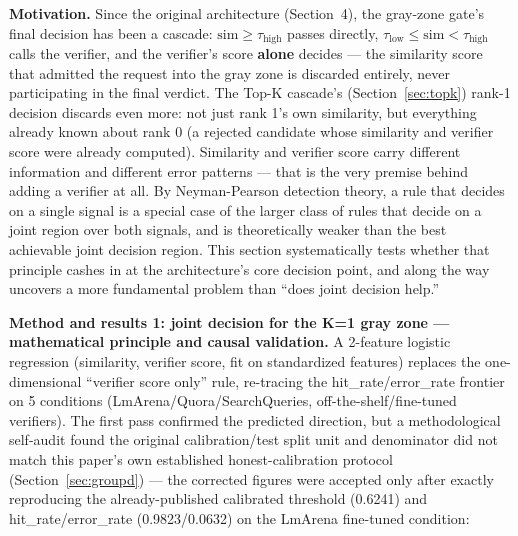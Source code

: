 \documentclass[11pt]{article}
\newcommand{\taulow}{\ensuremath{\tau_{\text{low}}}}
\newcommand{\tauhigh}{\ensuremath{\tau_{\text{high}}}}
\begin{document}
\textbf{Motivation.} Since the original architecture (Section~4), the gray-zone gate's final decision has been a cascade: $\text{sim} \ge \tauhigh$ passes directly, $\taulow \le \text{sim} < \tauhigh$ calls the verifier, and the verifier's score \textbf{alone} decides --- the similarity score that admitted the request into the gray zone is discarded entirely, never participating in the final verdict. The Top-K cascade's (Section~\ref{sec:topk}) rank-1 decision discards even more: not just rank 1's own similarity, but everything already known about rank 0 (a rejected candidate whose similarity and verifier score were already computed). Similarity and verifier score carry different information and different error patterns --- that is the very premise behind adding a verifier at all. By Neyman-Pearson detection theory, a rule that decides on a single signal is a special case of the larger class of rules that decide on a joint region over both signals, and is theoretically weaker than the best achievable joint decision region. This section systematically tests whether that principle cashes in at the architecture's core decision point, and along the way uncovers a more fundamental problem than ``does joint decision help.''

\textbf{Method and results 1: joint decision for the K=1 gray zone --- mathematical principle and causal validation.} A 2-feature logistic regression (similarity, verifier score, fit on standardized features) replaces the one-dimensional ``verifier score only'' rule, re-tracing the hit\_rate/error\_rate frontier on 5 conditions (LmArena/Quora/SearchQueries, off-the-shelf/fine-tuned verifiers). The first pass confirmed the predicted direction, but a methodological self-audit found the original calibration/test split unit and denominator did not match this paper's own established honest-calibration protocol (Section~\ref{sec:groupd}) --- the corrected figures were accepted only after exactly reproducing the already-published calibrated threshold (0.6241) and hit\_rate/error\_rate (0.9823/0.0632) on the LmArena fine-tuned condition:
\end{document}
